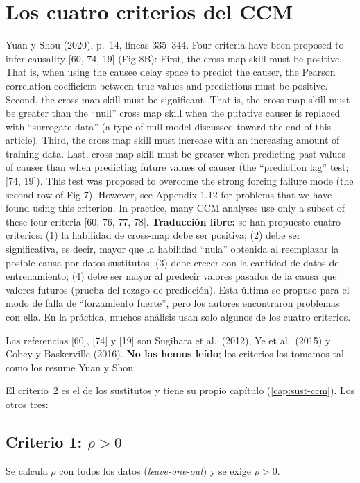 \documentclass[11pt,openany]{book}
\begin{document}
\section{Los cuatro criterios del CCM}

\begin{cita}{Yuan y Shou (2020), p.~14, líneas 335--344.}
Four criteria have been proposed to infer causality [60, 74, 19] (Fig 8B): First, the cross map skill must be positive. That is, when using the causee delay space to predict the causer, the Pearson correlation coefficient between true values and predictions must be positive. Second, the cross map skill must be significant. That is, the cross map skill must be greater than the “null” cross map skill when the putative causer is replaced with “surrogate data” (a type of null model discussed toward the end of this article). Third, the cross map skill must increase with an increasing amount of training data. Last, cross map skill must be greater when predicting past values of causer than when predicting future values of causer (the “prediction lag” test; [74, 19]). This test was proposed to overcome the strong forcing failure mode (the second row of Fig 7). However, see Appendix 1.12 for problems that we have found using this criterion. In practice, many CCM analyses use only a subset of these four criteria [60, 76, 77, 78].
\tcblower
\textbf{Traducción libre:} se han propuesto cuatro criterios: (1) la habilidad de cross-map debe ser positiva; (2) debe ser significativa, es decir, mayor que la habilidad ``nula'' obtenida al reemplazar la posible causa por datos sustitutos; (3) debe crecer con la cantidad de datos de entrenamiento; (4) debe ser mayor al predecir valores pasados de la causa que valores futuros (prueba del rezago de predicción). Esta última se propuso para el modo de falla de ``forzamiento fuerte'', pero los autores encontraron problemas con ella. En la práctica, muchos análisis usan solo algunos de los cuatro criterios.
\end{cita}

Las referencias [60], [74] y [19] son Sugihara et al.\ (2012), Ye et al.\ (2015) y Cobey y Baskerville (2016). \textbf{No las hemos leído}; los criterios los tomamos tal como los resume Yuan y Shou.

El criterio~2 es el de los sustitutos y tiene su propio capítulo (\ref{cap:sust-ccm}). Los otros tres:

\subsection*{Criterio 1: $\rho > 0$}
Se calcula $\rho$ con todos los datos (\emph{leave-one-out}) y se exige $\rho > 0$.
\end{document}
